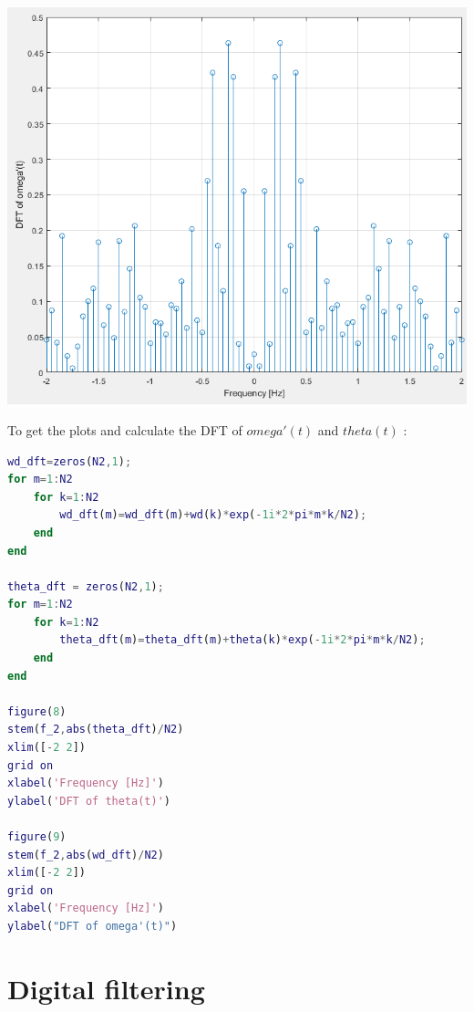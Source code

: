 \documentclass[a4paper,12pt]{article}
\begin{document}
\begin{enumerate}[label={\color{blue}\arabic*)}]
\begin{multicols}{2}
\begin{flushright}
            \includegraphics[width=1\linewidth]{Images/DFT_omega_dot.png}
            \label{Figure12}
        \end{flushright}
        
    \end{multicols}
    To get the plots and calculate the DFT of \(omega'(t)\) and \(theta(t)\) :
    \begin{lstlisting}[style=Matlab-editor,language=Matlab, basicstyle=\small\ttfamily]
wd_dft=zeros(N2,1);
for m=1:N2
    for k=1:N2
        wd_dft(m)=wd_dft(m)+wd(k)*exp(-1i*2*pi*m*k/N2);
    end
end

theta_dft = zeros(N2,1);
for m=1:N2
    for k=1:N2
        theta_dft(m)=theta_dft(m)+theta(k)*exp(-1i*2*pi*m*k/N2);
    end
end

figure(8)
stem(f_2,abs(theta_dft)/N2)
xlim([-2 2])
grid on
xlabel('Frequency [Hz]')
ylabel('DFT of theta(t)')

figure(9)
stem(f_2,abs(wd_dft)/N2)
xlim([-2 2])
grid on
xlabel('Frequency [Hz]')
ylabel("DFT of omega'(t)")
        \end{lstlisting}

\end{enumerate}

\newpage
\section{Digital filtering}
\end{document}
